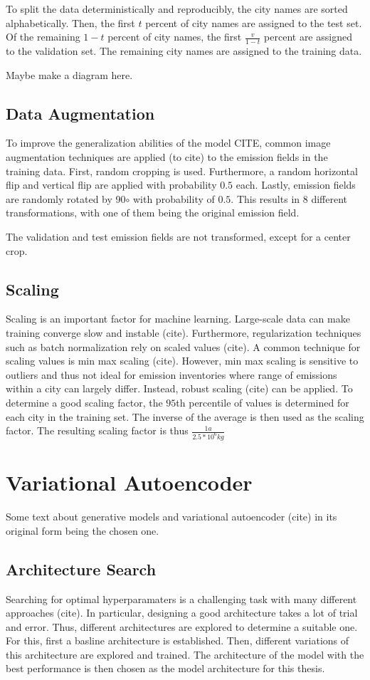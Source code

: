 To split the data deterministically and reproducibly, the city names are sorted alphabetically.
Then, the first $t$ percent of city names are assigned to the test set.
Of the remaining $1 - t$ percent of city names, the first $\frac{v}{1 - t}$ percent are assigned to the validation set.
The remaining city names are assigned to the training data.

Maybe make a diagram here.

\subsection{Data Augmentation}
To improve the generalization abilities of the model CITE, common image augmentation techniques are applied (to cite) to the emission fields in the training data.
First, random cropping is used.
Furthermore, a random horizontal flip and vertical flip are applied with probability $0.5$ each.
Lastly, emission fields are randomly rotated by 90$\circ$ with probability of $0.5$.
This results in $8$ different transformations, with one of them being the original emission field.

The validation and test emission fields are not transformed, except for a center crop.

\subsection{Scaling}
Scaling is an important factor for machine learning.
Large-scale data can make training converge slow and instable (cite).
Furthermore, regularization techniques such as batch normalization rely on scaled values (cite).
A common technique for scaling values is min max scaling (cite).
However, min max scaling is sensitive to outliers and thus not ideal for emission inventories where range of emissions within a city can largely differ.
Instead, robust scaling (cite) can be applied.
To determine a good scaling factor, the $95$th percentile of values is determined for each city in the training set.
The inverse of the average is then used as the scaling factor.
The resulting scaling factor is thus $\frac{1 a}{2.5 * 10^6 kg}$

\section{Variational Autoencoder}
Some text about generative models and variational autoencoder (cite) in its original form being the chosen one.

\subsection{Architecture Search}
Searching for optimal hyperparamaters is a challenging task with many different approaches (cite).
In particular, designing a good architecture takes a lot of trial and error.
Thus, different architectures are explored to determine a suitable one.
For this, first a basline architecture is established.
Then, different variations of this architecture are explored and trained.
The architecture of the model with the best performance is then chosen as the model architecture for this thesis.

